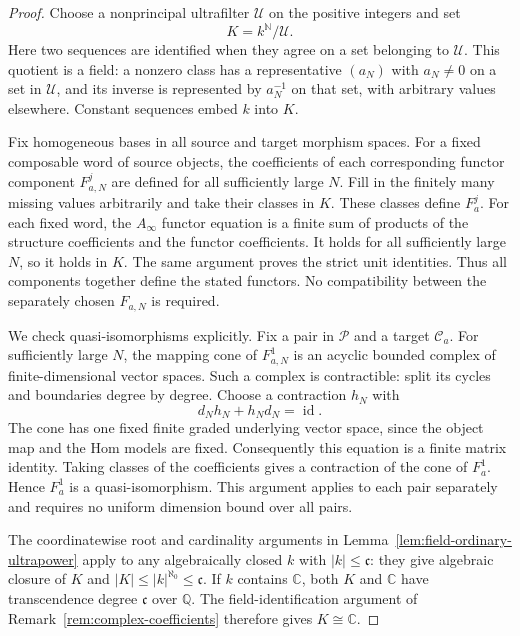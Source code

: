 \documentclass[11pt]{article}
\numberwithin{equation}{section}
\theoremstyle{definition}
\theoremstyle{remark}
\newcommand{\Q}{\mathbb Q}
\newcommand{\C}{\mathbb C}
\newcommand{\N}{\mathbb N}
\newcommand{\id}{\operatorname{id}}
\begin{document}
\begin{proof}
Choose a nonprincipal ultrafilter $\mathcal U$ on the positive integers
and set
\[
 K=k^{\N}/\mathcal U.
\]
Here two sequences are identified when they agree on a set belonging to
$\mathcal U$.  This quotient is a field: a nonzero class has a
representative $(a_N)$ with $a_N\ne0$ on a set in $\mathcal U$, and its
inverse is represented by $a_N^{-1}$ on that set, with arbitrary values
elsewhere.  Constant sequences embed $k$ into $K$.

Fix homogeneous bases in all source and target morphism spaces.  For a
fixed composable word of source objects, the coefficients of each
corresponding functor component $F_{a,N}^j$ are defined for all sufficiently
large $N$.  Fill in the finitely many missing values arbitrarily and take
their classes in $K$.  These classes define $F_a^j$.  For each fixed word,
the $A_\infty$ functor equation is a finite sum of products of the
structure coefficients and the functor coefficients.  It holds for all
sufficiently large $N$, so it holds in $K$.  The same argument proves the
strict unit identities.  Thus all components together define the stated
functors.  No compatibility between the separately chosen $F_{a,N}$ is
required.

We check quasi-isomorphisms explicitly.  Fix a pair in $\mathcal P$ and a
target $\mathcal C_a$.  For sufficiently large $N$, the mapping cone of
$F_{a,N}^1$ is an acyclic bounded complex of finite-dimensional vector
spaces.  Such a complex is contractible: split its cycles and boundaries
degree by degree.  Choose a contraction $h_N$ with
\[
 d_Nh_N+h_Nd_N=\id.
\]
The cone has one fixed finite graded underlying vector space, since the
object map and the Hom models are fixed.  Consequently this equation is
a finite matrix identity.  Taking classes of the coefficients gives a
contraction of the cone of $F_a^1$.  Hence $F_a^1$ is a quasi-isomorphism.
This argument applies to each pair separately and requires no uniform
dimension bound over all pairs.

The coordinatewise root and cardinality arguments in
Lemma~\ref{lem:field-ordinary-ultrapower} apply to any algebraically
closed $k$ with $|k|\le\mathfrak c$: they give algebraic closure of
$K$ and $|K|\le |k|^{\aleph_0}\le\mathfrak c$.
If $k$ contains $\C$, both $K$ and $\C$ have transcendence degree
$\mathfrak c$ over $\Q$.  The field-identification argument of
Remark~\ref{rem:complex-coefficients} therefore gives $K\cong\C$.
\end{proof}
\end{document}

